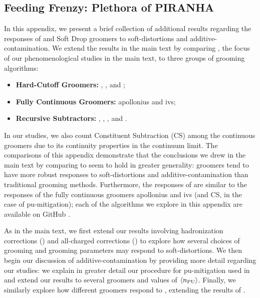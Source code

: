 \begin{subappendices}
\section[Feeding Frenzy: Plethora of \textsc{Piranha}]{Feeding Frenzy: Plethora of PIRANHA}
\label{app:feedingfrenzy}
In this appendix, we present a brief collection of additional results regarding the responses of \PIRANHA{} and Soft Drop groomers to \glspl{soft-distortion} and \gls{additive-contamination}.
%
We extend the results in the main text by comparing , the focus of our phenomenological studies in the main text, to three groups of grooming algorithms:
%
\begin{itemize}
    \item
    \textbf{Hard-Cutoff Groomers:}
    , , and ;

    \item
    \textbf{Fully Continuous Groomers:}
    \gls{apollonius} and \gls{ivs};

    \item
    \textbf{Recursive Subtractors:}
    , , , and .
\end{itemize}
In our  studies, we also count Constituent Subtraction (CS) \cite{Berta:2014eza} among the continuous groomers due to its continuity properties in the continuum limit.
%
The comparisons of this appendix demonstrate that the conclusions we drew in the main text by comparing  to  seem to hold in greater generality:
%
\PIRANHA{} groomers tend to have more robust responses to \glspl{soft-distortion} and \gls{additive-contamination} than traditional grooming methods.
%
Furthermore, the responses of  are similar to the responses of the fully continuous groomers \gls{apollonius} and \gls{ivs} (and CS, in the case of \gls{pu-mitigation});
%
each of the \PIRANHA{} algorithms we explore in this appendix are available on GitHub \cite{piranhagithub}.

As in the main text, we first extend our results involving \gls{hadronization} corrections () and all-charged corrections () to explore how several choices of grooming and grooming parameters may respond to \glspl{soft-distortion}.
%
We then begin our discussion of \gls{additive-contamination} by providing more detail regarding our  studies:
%
we explain in greater detail our procedure for \gls{pu-mitigation} used in  and extend our results to several groomers and values of \(\langle n_{\rm PU}\rangle\).
%
Finally, we similarly explore how different groomers respond to , extending the results of .



\end{subappendices}
